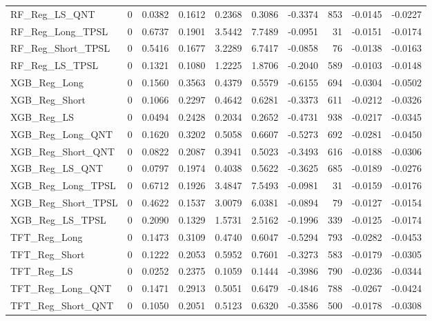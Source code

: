 \begin{tabular}{llrrrrrrrr}
\cline{1-10}
RF\_Reg\_LS\_QNT & 0 & 0.0382 & 0.1612 & 0.2368 & 0.3086 & -0.3374 & 853 & -0.0145 & -0.0227 \\
\cline{1-10}
RF\_Reg\_Long\_TPSL & 0 & 0.6737 & 0.1901 & 3.5442 & 7.7489 & -0.0951 & 31 & -0.0151 & -0.0174 \\
\cline{1-10}
RF\_Reg\_Short\_TPSL & 0 & 0.5416 & 0.1677 & 3.2289 & 6.7417 & -0.0858 & 76 & -0.0138 & -0.0163 \\
\cline{1-10}
RF\_Reg\_LS\_TPSL & 0 & 0.1321 & 0.1080 & 1.2225 & 1.8706 & -0.2040 & 589 & -0.0103 & -0.0148 \\
\cline{1-10}
XGB\_Reg\_Long & 0 & 0.1560 & 0.3563 & 0.4379 & 0.5579 & -0.6155 & 694 & -0.0304 & -0.0502 \\
\cline{1-10}
XGB\_Reg\_Short & 0 & 0.1066 & 0.2297 & 0.4642 & 0.6281 & -0.3373 & 611 & -0.0212 & -0.0326 \\
\cline{1-10}
XGB\_Reg\_LS & 0 & 0.0494 & 0.2428 & 0.2034 & 0.2652 & -0.4731 & 938 & -0.0217 & -0.0345 \\
\cline{1-10}
XGB\_Reg\_Long\_QNT & 0 & 0.1620 & 0.3202 & 0.5058 & 0.6607 & -0.5273 & 692 & -0.0281 & -0.0450 \\
\cline{1-10}
XGB\_Reg\_Short\_QNT & 0 & 0.0822 & 0.2087 & 0.3941 & 0.5023 & -0.3493 & 616 & -0.0188 & -0.0306 \\
\cline{1-10}
XGB\_Reg\_LS\_QNT & 0 & 0.0797 & 0.1974 & 0.4038 & 0.5622 & -0.3625 & 685 & -0.0189 & -0.0276 \\
\cline{1-10}
XGB\_Reg\_Long\_TPSL & 0 & 0.6712 & 0.1926 & 3.4847 & 7.5493 & -0.0981 & 31 & -0.0159 & -0.0176 \\
\cline{1-10}
XGB\_Reg\_Short\_TPSL & 0 & 0.4622 & 0.1537 & 3.0079 & 6.0381 & -0.0894 & 79 & -0.0127 & -0.0154 \\
\cline{1-10}
XGB\_Reg\_LS\_TPSL & 0 & 0.2090 & 0.1329 & 1.5731 & 2.5162 & -0.1996 & 339 & -0.0125 & -0.0174 \\
\cline{1-10}
TFT\_Reg\_Long & 0 & 0.1473 & 0.3109 & 0.4740 & 0.6047 & -0.5294 & 793 & -0.0282 & -0.0453 \\
\cline{1-10}
TFT\_Reg\_Short & 0 & 0.1222 & 0.2053 & 0.5952 & 0.7601 & -0.3273 & 583 & -0.0179 & -0.0305 \\
\cline{1-10}
TFT\_Reg\_LS & 0 & 0.0252 & 0.2375 & 0.1059 & 0.1444 & -0.3986 & 790 & -0.0236 & -0.0344 \\
\cline{1-10}
TFT\_Reg\_Long\_QNT & 0 & 0.1471 & 0.2913 & 0.5051 & 0.6479 & -0.4846 & 788 & -0.0267 & -0.0424 \\
\cline{1-10}
TFT\_Reg\_Short\_QNT & 0 & 0.1050 & 0.2051 & 0.5123 & 0.6320 & -0.3586 & 500 & -0.0178 & -0.0308 \\

\end{tabular}
